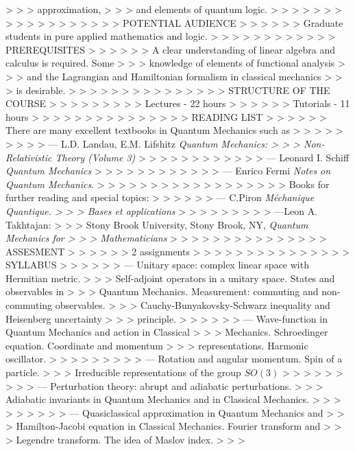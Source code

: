  > > > approximation,
 > > > and elements of quantum logic.
 > > >
 > > >
 > > >
 > > >
 > > >
 > > >                  POTENTIAL AUDIENCE
 > > >
 > > > Graduate students in pure applied mathematics and logic.
 > > >
 > > >
 > > >
 > > >                    PREREQUISITES
 > > >
 > > > A clear understanding of linear algebra and calculus is required. Some
 > > > knowledge of elements of functional analysis
 > > > and the Lagrangian and Hamiltonian formalism in classical mechanics
 > > > is desirable.
 > > >
 > > >
 > > >
 > > >
 > > >                STRUCTURE OF THE COURSE
 > > >
 > > >
 > > > Lectures - 22 hours
 > > >
 > > > Tutorials - 11 hours
 > > >
 > > >
 > > >
 > > >
 > > >                             READING LIST
 > > >
 > > > There are many excellent textbooks in Quantum Mechanics such as
 > > >
 > > >
 > > >  --- L.D. Landau, E.M. Lifshitz   {\it Quantum Mechanics:
 > > >      Non-Relativistic Theory (Volume 3)}
 > > >
 > > >
 > > >
 > > >   --- Leonard I. Schiff {\it Quantum Mechanics}
 > > >
 > > >
 > > >
 > > >    ---  Enrico Fermi {\it Notes on Quantum Mechanics}.
 > > >
 > > >
 > > >
 > > >
 > > >
 > > > Books for further reading and  special topics:
 > > >
 > > >    --- C.Piron {\it M\'echanique Quantique.
 > > >         Bases et applications}
 > > >
 > > >
 > > >     ---Leon A. Takhtajan:
 > > >   Stony Brook University, Stony Brook, NY, {\it Quantum Mechanics for
 > > > Mathematicians}
 > > >
 > > >
 > > >
 > > >
 > > >                        ASSESMENT
 > > >
 > > > 2 assignments
 > > >
 > > >
 > > >
 > > >
 > > >                  SYLLABUS
 > > >
 > > > --- Unitary space: complex linear space with Hermitian metric.
 > > > Self-adjoint operators in a unitary space. States and observables in
 > > > Quantum Mechanics. Measurement: commuting and non-commuting observables.
 > > > Cauchy-Bunyakovsky-Schwarz inequality and Heisenberg uncertainty
 > > > principle.
 > > >
 > > > ---  Wave-function in Quantum Mechanics and action in Classical
 > > > Mechanics. Schroedinger equation. Coordinate and momentum
 > > > representations. Harmonic oscillator.
 > > >
 > > >
 > > > --- Rotation and angular momentum. Spin of a particle.
 > > >     Irreducible representations of the group $SO(3)$
 > > >
 > > >
 > > > --- Perturbation theory: abrupt and adiabatic perturbations.
 > > > Adiabatic invariants in Quantum Mechanics and in Classical Mechanics.
 > > >
 > > >
 > > > --- Quasiclassical approximation in Quantum Mechanics and
 > > > Hamilton-Jacobi equation in Classical Mechanics. Fourier transform and
 > > > Legendre transform. The idea of Maslov index.
 > > >
